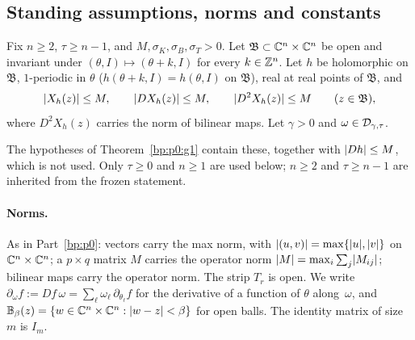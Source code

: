 \subsection{Standing assumptions, norms and constants}\label{bp:p2:sec-setting}

\begin{assumption}\label{bp:p2:standing}
Fix $n\ge2$, $\tau\ge n-1$, and $M,\sigma_K,\sigma_B,\sigma_T>0$. Let
$\mathfrak B\subset\mathbb{C}^n\times\mathbb{C}^n$ be open and invariant under $(\theta,I)\mapsto(\theta+k,I)$ for every
$k\in\mathbb{Z}^n$. Let $h$ be holomorphic on $\mathfrak B$, $1$-periodic in $\theta$
($h(\theta+k,I)=h(\theta,I)$ on $\mathfrak B$), real at real points of $\mathfrak B$, and
\[
\lvert X_h(z)\rvert\le M,\qquad\lvert DX_h(z)\rvert\le M,\qquad\lvert D^2X_h(z)\rvert\le M\qquad(z\in\mathfrak B),
\]
where $D^2X_h(z)$ carries the norm of bilinear maps. Let $\gamma>0$ and $\omega\in\mathcal{D}_{\gamma,\tau}$.
\end{assumption}

The hypotheses of Theorem~\ref{bp:p0:g1} contain these, together with $\lvert Dh\rvert\le M$, which is not
used. Only $\tau\ge0$ and $n\ge1$ are used below; $n\ge2$ and $\tau\ge n-1$ are inherited from the
frozen statement.

\paragraph{Norms.} As in Part~\ref{bp:p0}: vectors carry the max norm, with
$\lvert (u,v)\rvert=\max\{\lvert u\rvert,\lvert v\rvert\}$ on $\mathbb{C}^n\times\mathbb{C}^n$; a $p\times q$ matrix $M$ carries the operator
norm $\lvert M\rvert=\max_i\sum_j\lvert M_{ij}\rvert$; bilinear maps carry the operator norm. The strip $T_r$ is open.
We write $\partial_\omega f:=Df\,\omega=\sum_\ell\omega_\ell\,\partial_{\theta_\ell}f$ for the derivative
of a function of $\theta$ along~$\omega$, and $\mathbb B_\beta(z)=\{w\in\mathbb{C}^n\times\mathbb{C}^n:\lvert w-z\rvert<\beta\}$
for open balls. The identity matrix of size $m$ is $I_m$.

